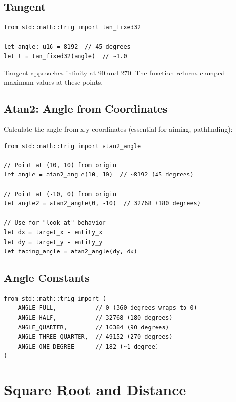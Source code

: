 \subsection{Tangent}

\begin{lstlisting}
from std::math::trig import tan_fixed32

let angle: u16 = 8192  // 45 degrees
let t = tan_fixed32(angle)  // ~1.0
\end{lstlisting}

\begin{warningbox}
Tangent approaches infinity at 90\textdegree{} and 270\textdegree{}. The function returns clamped maximum values at these points.
\end{warningbox}

\subsection{Atan2: Angle from Coordinates}

Calculate the angle from x,y coordinates (essential for aiming, pathfinding):

\begin{lstlisting}
from std::math::trig import atan2_angle

// Point at (10, 10) from origin
let angle = atan2_angle(10, 10)  // ~8192 (45 degrees)

// Point at (-10, 0) from origin
let angle2 = atan2_angle(0, -10)  // 32768 (180 degrees)

// Use for "look at" behavior
let dx = target_x - entity_x
let dy = target_y - entity_y
let facing_angle = atan2_angle(dy, dx)
\end{lstlisting}

\subsection{Angle Constants}

\begin{lstlisting}
from std::math::trig import (
    ANGLE_FULL,           // 0 (360 degrees wraps to 0)
    ANGLE_HALF,           // 32768 (180 degrees)
    ANGLE_QUARTER,        // 16384 (90 degrees)
    ANGLE_THREE_QUARTER,  // 49152 (270 degrees)
    ANGLE_ONE_DEGREE      // 182 (~1 degree)
)
\end{lstlisting}

\section{Square Root and Distance}
\label{sec:math-sqrt}

